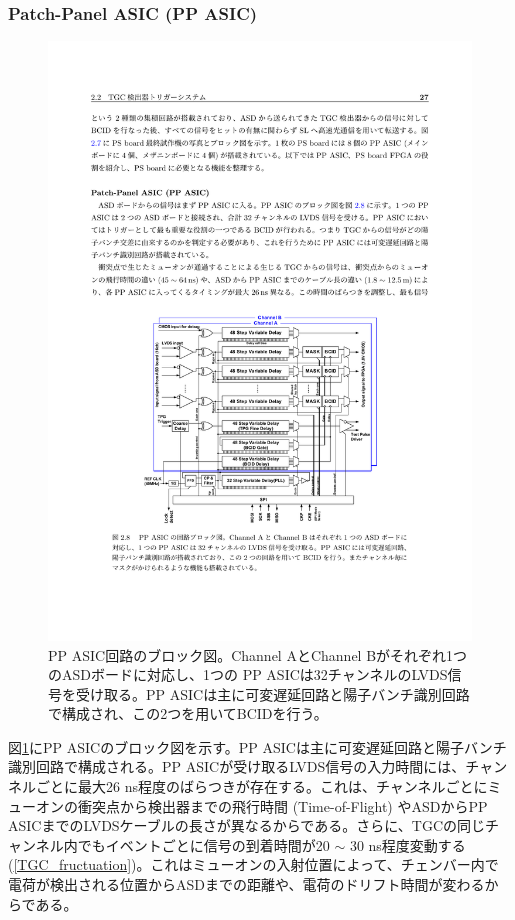     \subsubsection*{Patch-Panel ASIC (PP ASIC)}


    \begin{figure} 
    \centering
    \includegraphics[width=16cm]{fig/Intro/TGC_PPASIC.pdf}
    \caption[PP ASIC回路のブロック図]{PP ASIC回路のブロック図\cite{PPASIC}。Channel AとChannel Bがそれぞれ1つのASDボードに対応し、1つの PP ASICは32チャンネルのLVDS信号を受け取る。PP ASICは主に可変遅延回路と陽子バンチ識別回路で構成され、この2つを用いてBCIDを行う。}
    \label{TGC_PPASIC}
    \end{figure}

    図\ref{TGC_PPASIC}にPP ASICのブロック図を示す。PP ASICは主に可変遅延回路と陽子バンチ識別回路で構成される。PP ASICが受け取るLVDS信号の入力時間には、チャンネルごとに最大26 ns程度のばらつきが存在する。これは、チャンネルごとにミューオンの衝突点から検出器までの飛行時間  (Time-of-Flight) やASDからPP ASICまでのLVDSケーブルの長さが異なるからである。さらに、TGCの同じチャンネル内でもイベントごとに信号の到着時間が20 $\sim$ 30 ns程度変動する (\ref{TGC_fructuation})。これはミューオンの入射位置によって、チェンバー内で電荷が検出される位置からASDまでの距離や、電荷のドリフト時間が変わるからである。

